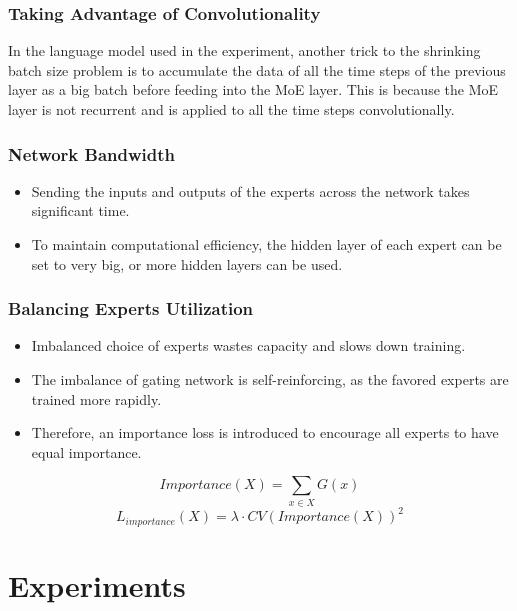 \documentclass[12pt,aspectratio=169]{beamer}
\begin{document}
    \begin{frame}
        \frametitle{Taking Advantage of Convolutionality}

        In the language model used in the experiment, another trick to the shrinking batch size problem is to accumulate
        the data of all the time steps of the previous layer as a big batch before feeding into the MoE layer. This is
        because the MoE layer is not recurrent and is applied to all the time steps convolutionally.
    \end{frame}

    \begin{frame}
        \frametitle{Network Bandwidth}

        \begin{itemize}
            \setlength{\itemsep}{.8em}
            \item Sending the inputs and outputs of the experts across the network takes significant time.
            \item To maintain computational efficiency, the hidden layer of each expert can be set to very big, or more hidden layers can be used.
        \end{itemize}
    \end{frame}

    \begin{frame}
        \frametitle{Balancing Experts Utilization}

        \begin{itemize}
            \setlength{\itemsep}{.8em}
            \item Imbalanced choice of experts wastes capacity and slows down training.
            \item The imbalance of gating network is self-reinforcing, as the favored experts are trained more rapidly.
            \item Therefore, an importance loss is introduced to encourage all experts to have equal importance.
        \end{itemize}

        $$ Importance(X) = \sum_{x \in X}G(x) $$
        $$ L_{importance}(X) = \lambda \cdot CV(Importance(X))^2 $$
    \end{frame}

    \section{Experiments}
\end{document}

